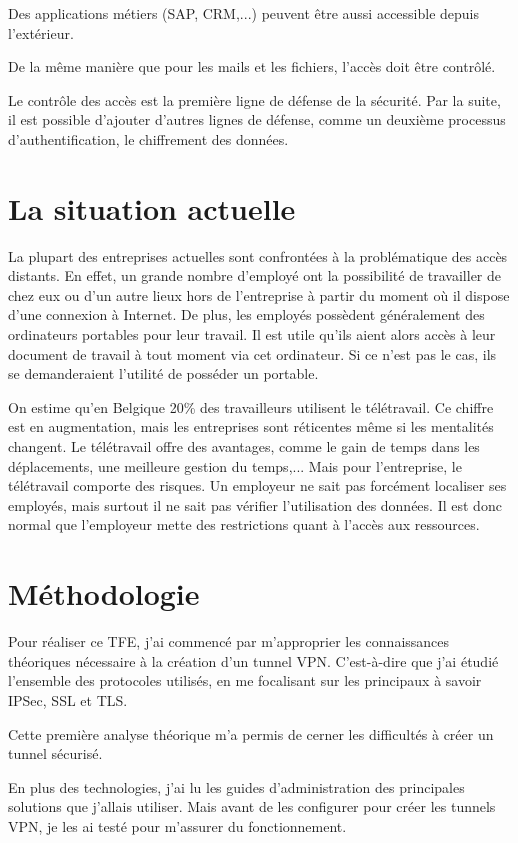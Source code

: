 Des applications métiers (SAP, CRM,...) peuvent être aussi accessible depuis l'extérieur.

De la même manière que pour les mails et les fichiers, l'accès doit être contrôlé.

Le contrôle des accès est la première ligne de défense de la sécurité.
Par la suite, il est possible d'ajouter d'autres lignes de défense, comme un deuxième processus d'authentification, le chiffrement des données.

\chapter{La situation actuelle}
La plupart des entreprises actuelles sont confrontées à la problématique des accès distants.
En effet, un grande nombre d'employé ont la possibilité de travailler de chez eux ou d'un autre lieux hors de l'entreprise à partir du moment où il dispose d'une connexion à Internet.
De plus, les employés possèdent généralement des ordinateurs portables pour leur travail.
Il est utile qu'ils aient alors accès à leur document de travail à tout moment via cet ordinateur.
Si ce n'est pas le cas, ils se demanderaient l'utilité de posséder un portable.

On estime qu'en Belgique 20\% des travailleurs utilisent le télétravail.
Ce chiffre est en augmentation, mais les entreprises sont réticentes même si les mentalités changent.
Le télétravail offre des avantages, comme le gain de temps dans les déplacements, une meilleure gestion du temps,...
Mais pour l'entreprise, le télétravail comporte des risques.
Un employeur ne sait pas forcément localiser ses employés, mais surtout il ne sait pas vérifier l'utilisation des données.
Il est donc normal que l'employeur mette des restrictions quant à l'accès aux ressources.
\chapter{Méthodologie}
Pour réaliser ce TFE, j'ai commencé par m'approprier les connaissances théoriques nécessaire à la création d'un tunnel VPN.
C'est-à-dire que j'ai étudié l'ensemble des protocoles utilisés, en me focalisant sur les principaux à savoir IPSec, SSL et TLS.

Cette première analyse théorique m'a permis de cerner les difficultés à créer un tunnel sécurisé.

En plus des technologies, j'ai lu les guides d'administration des principales solutions que j'allais utiliser.
Mais avant de les configurer pour créer les tunnels VPN, je les ai testé pour m'assurer du fonctionnement.

